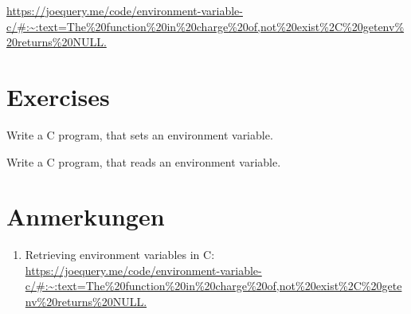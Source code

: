 \documentclass{dcbl/challenge}
\begin{document}
\url{https://joequery.me/code/environment-variable-c/#:~:text=The%20function%20in%20charge%20of,not%20exist%2C%20getenv%20returns%20NULL.}

\section*{Exercises}
\begin{aufgabe}
    Write a C program, that sets an environment variable.
\end{aufgabe}

\begin{aufgabe}
    Write a C program, that reads an environment variable.
\end{aufgabe}

\section*{Anmerkungen}
\begin{enumerate}
    \item Retrieving environment variables in C: \url{https://joequery.me/code/environment-variable-c/#:~:text=The%20function%20in%20charge%20of,not%20exist%2C%20getenv%20returns%20NULL.}
\end{enumerate}
\end{document}
